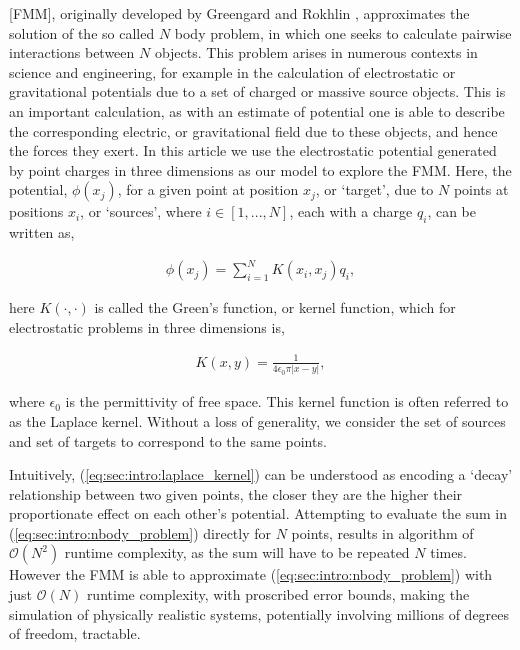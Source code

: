 \documentclass{IEEEcsmag}
\begin{document}
 [FMM], originally developed by Greengard and Rokhlin \cite{Greengard1987}, approximates the solution of the so called $N$ body problem, in which one seeks to calculate pairwise interactions between $N$ objects. This problem arises in numerous contexts in science and engineering, for example in the calculation of electrostatic or gravitational potentials due to a set of charged or massive source objects. This is an important calculation, as with an estimate of potential one is able to describe the corresponding electric, or gravitational field due to these objects, and hence the forces they exert. In this article we use the electrostatic potential generated by point charges in three dimensions as our model to explore the FMM. Here, the potential, $\phi(x_j)$, for a given point at position $x_j$, or `target', due to $N$ points at positions $x_i$, or `sources', where $i \in [1, ..., N]$, each with a charge $q_i$, can be written as,

\begin{eqnarray}
	\phi(x_j) = \sum_{i=1}^{N} K(x_i, x_j) q_i,
\label{eq:sec:intro:nbody_problem}
\end{eqnarray}


here $K(\cdot, \cdot)$ is called the Green's function, or kernel function, which for electrostatic problems in three dimensions is,

\begin{eqnarray}
	K(x, y) = \frac{1}{4\epsilon_0\pi|x-y|},
\label{eq:sec:intro:laplace_kernel}
\end{eqnarray}

where $\epsilon_0$ is the permittivity of free space. This kernel function is often referred to as the Laplace kernel. Without a loss of generality, we consider the set of sources and set of targets to correspond to the same points.

Intuitively, (\ref{eq:sec:intro:laplace_kernel}) can be understood as encoding a `decay' relationship between two given points, the closer they are the higher their proportionate effect on each other's potential. Attempting to evaluate the sum in (\ref{eq:sec:intro:nbody_problem}) directly for $N$ points, results in algorithm of $\mathcal{O}(N^2)$ runtime complexity, as the sum will have to be repeated $N$ times. However the FMM is able to approximate (\ref{eq:sec:intro:nbody_problem}) with just $\mathcal{O}(N)$ runtime complexity, with proscribed error bounds, making the simulation of physically realistic systems, potentially involving millions of degrees of freedom, tractable.
\end{document}
